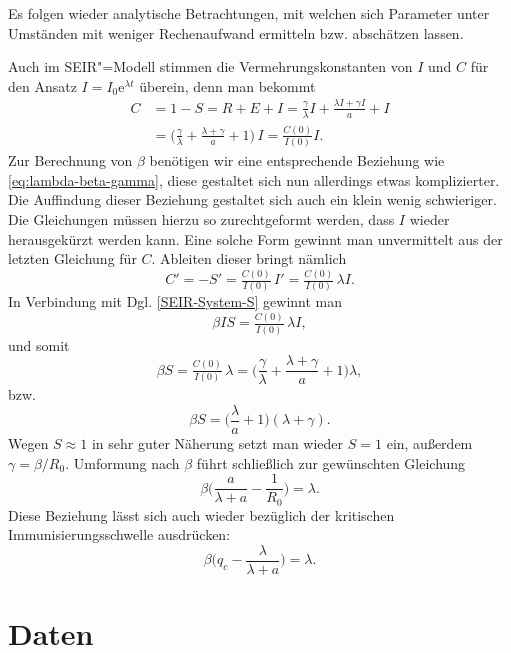 \documentclass[a4paper,11pt,fleqn,twocolumn,twoside,dvipdfmx]{scrartcl}
\numberwithin{equation}{section}
\newcommand{\ee}{\mathrm e}
\begin{document}
Es folgen wieder analytische Betrachtungen, mit welchen sich
Parameter unter Umständen mit weniger Rechenaufwand ermitteln
bzw. abschätzen lassen.

Auch im SEIR"=Modell stimmen die Vermehrungskonstanten von $I$
und $C$ für den Ansatz $I=I_0\ee^{\lambda t}$ überein, denn man bekommt
\begin{align*}
C &= 1-S = R+E+I = \frac{\gamma}{\lambda}I+\frac{\lambda I+\gamma I}{a}+I\\
&= \Big(\frac{\gamma}{\lambda}+\frac{\lambda+\gamma}{a}+1\Big)\,I
= \tfrac{C(0)}{I(0)} I.
\end{align*}
Zur Berechnung von $\beta$ benötigen wir eine entsprechende Beziehung
wie \eqref{eq:lambda-beta-gamma}, diese gestaltet sich nun allerdings
etwas komplizierter. Die Auffindung dieser Beziehung gestaltet sich
auch ein klein wenig schwieriger. Die Gleichungen müssen hierzu so
zurechtgeformt werden, dass $I$ wieder herausgekürzt werden kann.
Eine solche Form gewinnt man unvermittelt aus der letzten Gleichung
für $C$. Ableiten dieser bringt nämlich
\begin{equation}
C' = -S' = \tfrac{C(0)}{I(0)}\,I' = \tfrac{C(0)}{I(0)}\,\lambda I.
\end{equation}
In Verbindung mit Dgl. \eqref{SEIR-System-S} gewinnt man
\begin{equation}
\beta IS = \tfrac{C(0)}{I(0)}\,\lambda I,
\end{equation}
und somit
\begin{equation}
\beta S = \tfrac{C(0)}{I(0)}\,\lambda
= \Big(\frac{\gamma}{\lambda}+\frac{\lambda+\gamma}{a}+1\Big)\lambda,
\end{equation}
bzw.
\begin{equation}
\beta S = \Big(\frac{\lambda}{a}+1\Big)(\lambda+\gamma).
\end{equation}
Wegen $S\approx 1$ in sehr guter Näherung setzt man wieder
$S=1$ ein, außerdem $\gamma=\beta/R_0$. Umformung nach $\beta$
führt schließlich zur gewünschten Gleichung
\begin{equation}
\beta\Big(\frac{a}{\lambda+a}-\frac{1}{R_0}\Big) = \lambda.
\end{equation}
Diese Beziehung lässt sich auch wieder bezüglich der kritischen
Immunisierungsschwelle ausdrücken:
\begin{equation}
\beta\Big(q_c-\frac{\lambda}{\lambda+a}\Big) = \lambda.
\end{equation}

\clearpage
\section{Daten}
\end{document}
